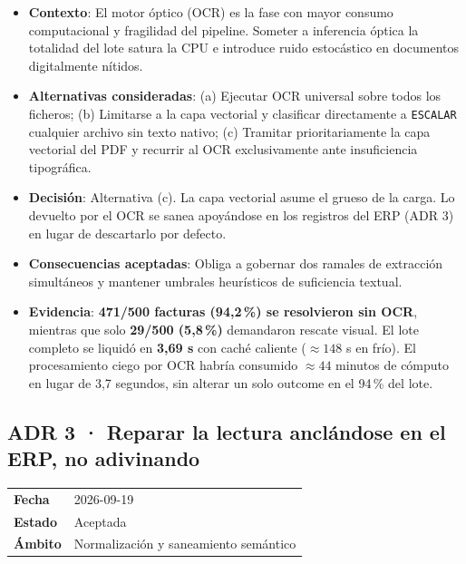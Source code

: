 \documentclass[11pt,a4paper]{article}
\begin{document}
\begin{itemize}[leftmargin=*, label={--}]
    \item \textbf{Contexto}: El motor óptico (OCR) es la fase con mayor consumo computacional y fragilidad del pipeline. Someter a inferencia óptica la totalidad del lote satura la CPU e introduce ruido estocástico en documentos digitalmente nítidos.
    \item \textbf{Alternativas consideradas}: (a) Ejecutar OCR universal sobre todos los ficheros; (b) Limitarse a la capa vectorial y clasificar directamente a \texttt{ESCALAR} cualquier archivo sin texto nativo; (c) Tramitar prioritariamente la capa vectorial del PDF y recurrir al OCR exclusivamente ante insuficiencia tipográfica.
    \item \textbf{Decisión}: Alternativa (c). La capa vectorial asume el grueso de la carga. Lo devuelto por el OCR se sanea apoyándose en los registros del ERP (ADR 3) en lugar de descartarlo por defecto.
    \item \textbf{Consecuencias aceptadas}: Obliga a gobernar dos ramales de extracción simultáneos y mantener umbrales heurísticos de suficiencia textual.
    \item \textbf{Evidencia}: \textbf{471/500 facturas (94,2\,\%) se resolvieron sin OCR}, mientras que solo \textbf{29/500 (5,8\,\%)} demandaron rescate visual. El lote completo se liquidó en \textbf{3,69 s} con caché caliente ($\approx 148$ s en frío). El procesamiento ciego por OCR habría consumido $\approx 44$ minutos de cómputo en lugar de 3,7 segundos, sin alterar un solo outcome en el 94\,\% del lote.
\end{itemize}

\subsection{ADR 3 · Reparar la lectura anclándose en el ERP, no adivinando}
\begin{table}[htbp]
\centering\small
\begin{tabular}{ll}
\toprule
\textbf{Fecha} & 2026-09-19 \\
\textbf{Estado} & Aceptada \\
\textbf{Ámbito} & Normalización y saneamiento semántico \\
\bottomrule
\end{tabular}
\end{table}
\end{document}
